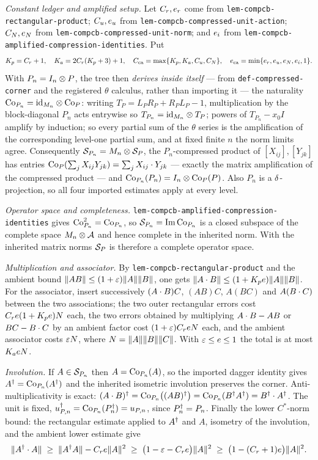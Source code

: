 \emph{Constant ledger and amplified setup.} Let $C_r,e_r$ come from
\texttt{lem-compcb-rectangular-product}; $C_u,e_u$ from
\texttt{lem-compcb-compressed-unit-action}; $C_N,e_N$ from
\texttt{lem-compcb-compressed-unit-norm}; and $e_i$ from
\texttt{lem-compcb-amplified-compression-identities}. Put
\[
  K_p=C_r+1,\quad K_a=2C_r(K_p+3)+1,\quad
  C_{\mathrm{ca}}=\max\{K_p,K_a,C_u,C_N\},\quad
  e_{\mathrm{ca}}=\min\{e_r,e_u,e_N,e_i,1\}.
\]
With $P_n=I_{n}\otimes P$, the tree then \emph{derives inside itself} --- from
\texttt{def-compressed-corner} and the registered $\theta$ calculus, rather than importing
it --- the naturality $\mathrm{Co}_{P_n}=\mathrm{id}_{M_{n}}\otimes\mathrm{Co}_{P}$: writing
$T_P=L_PR_P+R_PL_P-1$, multiplication by the block-diagonal $P_n$ acts entrywise so
$T_{P_n}=\mathrm{id}_{M_{n}}\otimes T_P$; powers of $T_{P_n}-x_0I$ amplify by induction;
so every partial sum of the $\theta$ series is the amplification of the corresponding
level-one partial sum, and at fixed finite $n$ the norm limits agree. Consequently
$\mathcal S_{P_n}=M_{n}\otimes \mathcal S_{P}$, the $P_n$-compressed product of $[X_{ij}],[Y_{jk}]$ has
entries $\mathrm{Co}_{P}(\sum_jX_{ij}Y_{jk})=\sum_j X_{ij}\mathbin{\cdot} Y_{jk}$ --- exactly the matrix
amplification of the compressed product --- and $\mathrm{Co}_{P_n}(P_n)=I_{n}\otimes \mathrm{Co}_{P}(P)$.
Also $P_n$ is a $\delta$-projection, so all four imported estimates apply at every level.

\emph{Operator space and completeness.} \texttt{lem-compcb-amplified-compression-identities}
gives $\mathrm{Co}_{P_n}^2=\mathrm{Co}_{P_n}$, so $\mathcal S_{P_n}=\operatorname{Im}\mathrm{Co}_{P_n}$ is a closed subspace of the
complete space $M_{n}\otimes \mathcal A$ and hence complete in the inherited norm. With the
inherited matrix norms $\mathcal S_{P}$ is therefore a complete operator space.

\emph{Multiplication and associator.} By
\texttt{lem-compcb-rectangular-product} and the ambient bound
$\lVert AB\rVert\le(1+\varepsilon)\lVert A\rVert\lVert B\rVert$, one gets
$\lVert A\mathbin{\cdot} B\rVert\le(1+K_pe)\lVert A\rVert\lVert B\rVert$. For the associator, insert successively
$(A\mathbin{\cdot} B)C$, $(AB)C$, $A(BC)$ and $A(B\mathbin{\cdot} C)$ between the two associations; the two
outer rectangular errors cost $C_re(1+K_pe)N$ each, the two errors obtained by
multiplying $A\mathbin{\cdot} B-AB$ or $BC-B\mathbin{\cdot} C$ by an ambient factor cost $(1+\varepsilon)C_re N$
each, and the ambient associator costs $\varepsilon N$, where $N=\lVert A\rVert\lVert B\rVert\lVert C\rVert$. With
$\varepsilon\le e\le1$ the total is at most $K_ae N$.

\emph{Involution.} If $A\in\mathcal S_{P_n}$ then $A=\mathrm{Co}_{P_n}(A)$, so the imported dagger
identity gives $A^{\dagger}=\mathrm{Co}_{P_n}(A^{\dagger})$ and the inherited isometric involution preserves the
corner. Anti-multiplicativity is exact:
$(A\mathbin{\cdot} B)^{\dagger}=\mathrm{Co}_{P_n}\bigl((AB)^{\dagger}\bigr)=\mathrm{Co}_{P_n}(B^{\dagger} A^{\dagger})=B^{\dagger}\mathbin{\cdot} A^{\dagger}$. The unit is
fixed, $u_{P,n}^{\dagger}=\mathrm{Co}_{P_n}(P_n^{\dagger})=u_{P,n}$, since $P_n^{\dagger}=P_n$. Finally the
lower $C^*$-norm bound: the rectangular estimate applied to $A^{\dagger}$ and $A$, isometry of
the involution, and the ambient lower estimate give
\[
  \lVert A^{\dagger}\mathbin{\cdot} A\rVert\;\ge\;\lVert A^{\dagger} A\rVert-C_re\lVert A\rVert^2\;\ge\;\bigl(1-\varepsilon-C_re\bigr)\lVert A\rVert^2
  \;\ge\;\bigl(1-(C_r+1)e\bigr)\lVert A\rVert^2 .
\]

